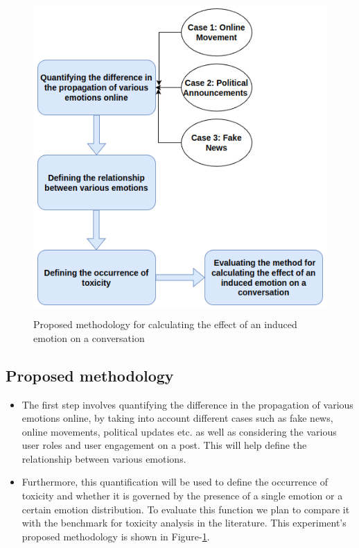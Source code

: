 \begin{figure}[h]
  
    \centering
    \includegraphics[width=12cm,height=12cm,keepaspectratio]{res2.png}
  \caption{Proposed methodology for calculating the effect of an induced emotion on a conversation}
  \label{fig:Frameworkres2}
  \end{figure} 
\subsection{Proposed methodology}
\begin{itemize}
    \item The first step involves quantifying the difference in the propagation of various emotions online, by taking into account different cases such as fake news, online movements, political updates etc. as well as considering the various user roles and user engagement on a post. This will help define the relationship between various emotions.
    \item Furthermore, this quantification will be used to define the occurrence of toxicity and whether it is governed by the presence of a single emotion or a certain emotion distribution. To evaluate this function we plan to compare it with the benchmark for toxicity analysis in the literature. This experiment's proposed methodology is shown in Figure-\ref{fig:Frameworkres2}.
\end{itemize}
